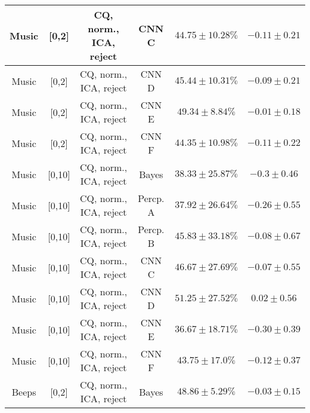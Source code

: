 \begin{table}[!htb]
{\begin{tabular}{c|c|c|c|c|c}
    Music               & [0,2]                                         & CQ, norm., ICA, reject     & CNN C                 &  $44.75 \pm 10.28\%$  & $-0.11 \pm 0.21$\\  
    \hline
    Music               & [0,2]                                         & CQ, norm., ICA, reject     & CNN D                 &  $45.44 \pm 10.31\%$  & $-0.09 \pm 0.21$\\  
    \hline
    Music               & [0,2]                                         & CQ, norm., ICA, reject     & CNN E                 &  $49.34 \pm 8.84\%$   & $-0.01 \pm 0.18$\\  
    \hline
    Music               & [0,2]                                         & CQ, norm., ICA, reject     & CNN F                 &  $44.35 \pm 10.98\%$  & $-0.11 \pm 0.22$\\  
    \hline
    Music               & [0,10]                                        & CQ, norm., ICA, reject     & Bayes                 &  $38.33 \pm 25.87\%$  & $-0.3 \pm 0.46$\\   
    \hline
    Music               & [0,10]                                        & CQ, norm., ICA, reject     & Percp. A              &  $37.92 \pm 26.64\%$  & $-0.26 \pm 0.55$\\  
    \hline
    Music               & [0,10]                                        & CQ, norm., ICA, reject     & Percp. B              &  $45.83 \pm 33.18\%$  & $-0.08 \pm 0.67$\\  
    \hline
    Music               & [0,10]                                        & CQ, norm., ICA, reject     & CNN C                 &  $46.67 \pm 27.69\%$  & $-0.07 \pm 0.55$\\  
    \hline
    Music               & [0,10]                                        & CQ, norm., ICA, reject     & CNN D                 &  $51.25 \pm 27.52\%$  & $0.02 \pm 0.56$\\  
    \hline
    Music               & [0,10]                                        & CQ, norm., ICA, reject     & CNN E                 &  $36.67 \pm 18.71\%$  & $-0.30 \pm 0.39$\\   
    \hline
    Music               & [0,10]                                        & CQ, norm., ICA, reject     & CNN F                 &  $43.75 \pm 17.0\%$   & $-0.12 \pm 0.37$\\ 
    \hline \hline
    Beeps               & [0,2]                                         & CQ, norm., ICA, reject     & Bayes                 &  $48.86 \pm 5.29\%$   & $-0.03 \pm 0.15$\\ 

\end{tabular}}
\end{table}
